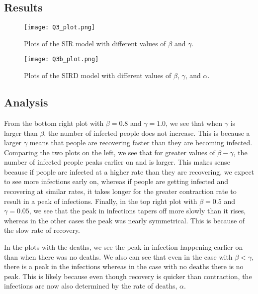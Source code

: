 \documentclass{article}
\begin{document}
\subsection*{Results}
\begin{figure}[H]
    \centering
    \texttt{[image: Q3\_plot.png]}
    \caption{Plots of the SIR model with different values of $\beta$ and $\gamma$.}
    \label{fig:my_label}
\end{figure}

\begin{figure}[H]
    \centering
    \texttt{[image: Q3b\_plot.png]}
    \caption{Plots of the SIRD model with different values of $\beta$, $\gamma$, and $\alpha$.}
    \label{fig:my_label}
\end{figure}



\subsection*{Analysis}
From the bottom right plot with $\beta=0.8$ and $\gamma=1.0$, we see that when $\gamma$ is larger than $\beta$, the number of infected people does  not increase. This is because a larger $\gamma$ means that people are recovering faster than they are becoming infected. Comparing the two plots on the left, we see that for greater values of $\beta -  \gamma$, the number of infected people peaks earlier on and is larger. This makes sense because if people are infected at a higher rate than they are recovering, we expect to see more infections early on, whereas if people are getting infected and recovering at similar rates, it takes longer for the greater contraction rate to result in a peak of infections. Finally, in the top right plot with $\beta=0.5$ and $\gamma=0.05$, we see that the peak in infections tapers off more slowly than it rises, whereas in the other cases the peak was nearly symmetrical. This is because of the slow rate of recovery. 

In the plots with the deaths, we see the peak in infection happening earlier on than when there was no deaths. We also can see that even in the case with $\beta < \gamma$, there is a peak in the infections whereas in the case with no deaths there is no peak. This is likely because even though recovery is quicker than contraction, the infections are now also determined by the rate of deaths, $\alpha$. 
\end{document}
